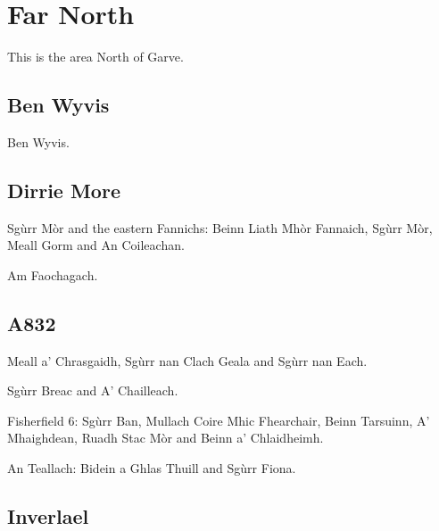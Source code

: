 \section{Far North}

This is the area North of Garve.

\subsection{Ben Wyvis}

\begin{munros}
\item
Ben Wyvis.
\end{munros}


\subsection{Dirrie More}

\begin{munros}
\item
Sgùrr Mòr and the eastern Fannichs: Beinn Liath Mhòr Fannaich, Sgùrr Mòr,
Meall Gorm and An Coileachan.

\item
Am Faochagach.
\end{munros}


\subsection{A832}

\begin{munros}
\item
Meall a' Chrasgaidh, Sgùrr nan Clach Geala and Sgùrr nan Each.

\item
Sgùrr Breac and A' Chailleach.

\item
Fisherfield 6: Sgùrr Ban, Mullach Coire Mhic Fhearchair, Beinn Tarsuinn, A'
Mhaighdean, Ruadh Stac Mòr and Beinn a' Chlaidheimh.

\item
An Teallach: Bidein a Ghlas Thuill and Sgùrr Fiona.
\end{munros}


\subsection{Inverlael}


